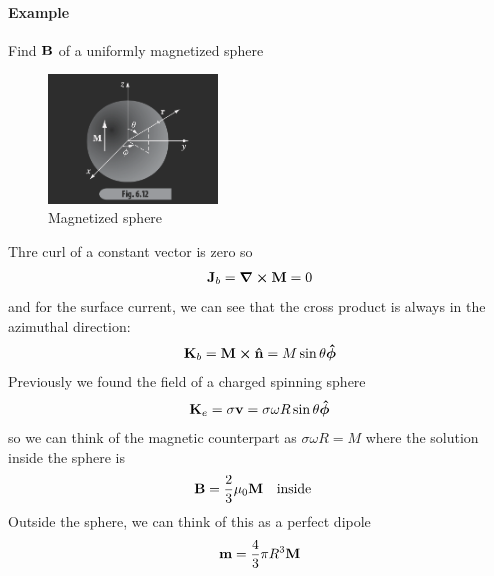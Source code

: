 \documentclass[../main.tex]{subfiles}
\begin{document}
\paragraph{Example} Find $\vb B$ of a uniformly magnetized sphere 
\begin{figure}[ht]
    \centering
    \includegraphics[width=0.4\textwidth]{fig6_12.png}
    \caption{Magnetized sphere}
    \label{fig:gr6_6}
\end{figure}

Thre curl of a constant vector is zero so
\begin{align*}
    \vb J_b = \grad \cross \vb M = 0
\end{align*}
and for the surface current, we can see that the cross product is always in the azimuthal direction:
\begin{align*}
    \vb K_b = \vb M \cross \vu n = M \sin\theta \vu*\phi
\end{align*}
Previously we found the field of a charged spinning sphere
\begin{align*}
    \vb K_e = \sigma \vb v = \sigma \omega R \sin\theta \vu*\phi
\end{align*}
so we can think of the magnetic counterpart as $\sigma \omega R = M$ where the solution inside the sphere is 
\begin{align*}
    \vb B = \frac{2}{3} \mu_0 \vb M \qqtext{inside}
\end{align*}
Outside the sphere, we can think of this as a perfect dipole
\begin{align*}
    \vb m = \frac{4}{3} \pi R^3 \vb M
\end{align*}
\end{document}
